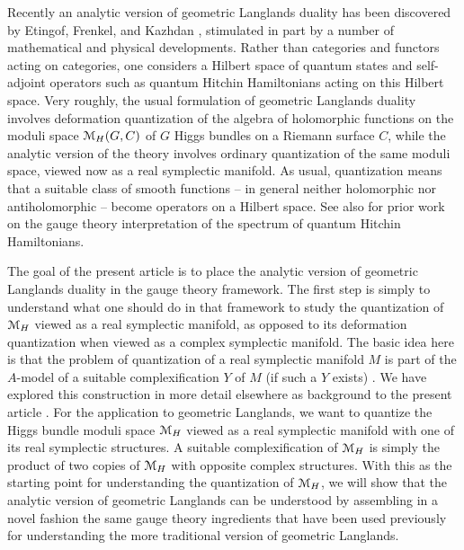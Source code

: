 \documentclass[11pt,a4paper]{article}
\begin{document}
Recently  an analytic version of geometric Langlands duality has been discovered by Etingof, Frenkel, and Kazhdan \cite{EFK,EFK2,EFK3}, stimulated in part by
a number of mathematical \cite{L} and physical \cite{T} developments.   Rather than categories and functors acting on categories, one considers
a Hilbert space of quantum states and self-adjoint operators such as quantum Hitchin Hamiltonians acting on this Hilbert space.    Very roughly, the usual formulation of geometric Langlands duality involves deformation quantization of the algebra of holomorphic functions on
 the moduli space ${\mathcal M}_H(G,C)$ of $G$ Higgs bundles on a Riemann surface $C$, while the analytic version
of the theory involves ordinary quantization of the same moduli space, viewed now as a real symplectic manifold.   As usual, quantization means that
 a suitable class of smooth functions -- in general neither holomorphic
nor antiholomorphic -- become operators on a Hilbert space. See also \cite{Teschner:2010je,Balasubramanian:2017gxc,Nekrasov:2010ka,Nekrasov:2009rc,Nekrasov:2011bc,Nekrasov:2014yra,Jeong:2018qpc,Bonelli:2011na} for prior work on the gauge theory interpretation of the spectrum of quantum Hitchin Hamiltonians. 

The goal of the present article is to place the analytic version of geometric Langlands duality in the gauge theory framework.   The first step is simply to
understand what one should do  in that framework to study  the quantization of ${\mathcal M}_H$ viewed as a real symplectic manifold, as opposed
to its deformation quantization when viewed as a complex symplectic manifold.    The basic idea here is that the problem of quantization of a real symplectic manifold $M$
is part of the $A$-model of a suitable complexification $Y$ of $M$ (if such a $Y$ exists) \cite{GuW}.   We have explored this construction in more detail elsewhere 
as background to the present article \cite{GW}.   For the application to geometric Langlands, 
we want to quantize the Higgs bundle moduli space ${\mathcal M}_H$ viewed as a real symplectic
manifold with one of its real symplectic structures.   A suitable complexification of ${\mathcal M}_H$ is simply the product of two copies of ${\mathcal M}_H$ with opposite complex
structures.   With this as the starting point for understanding the quantization of ${\mathcal M}_H$, we will show that the analytic version of geometric Langlands
can be understood by assembling in a novel fashion the same  gauge theory 
ingredients that have been used previously for  understanding the more traditional version of geometric Langlands.
\end{document}
